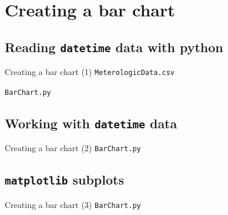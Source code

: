 \documentclass[t]{beamer}
\begin{document}
\section{Creating a bar chart}
\subsection{Reading \texttt{datetime} data with python}
\begin{frame}{Creating a bar chart (1)}
  \small{\texttt{MeterologicData.csv}}
  \vspace{-15pt}\begin{figure}[ht]
  \centering
        \lstset{numbers=left}
        
        
   \end{figure}
  \vspace{-15pt}\small{\texttt{BarChart.py}}
  \vspace{-15pt}\begin{figure}[ht]
  \centering
        \lstset{numbers=left}
        
        
   \end{figure}
\end{frame}

\subsection{Working with \texttt{datetime} data}
\begin{frame}{Creating a bar chart (2)}
  \small{\texttt{BarChart.py}}
  \vspace{-15pt}\begin{figure}[ht]
  \centering
        \lstset{numbers=left}
        
   \end{figure}
\end{frame}

\subsection{\texttt{matplotlib} subplots}
\begin{frame}{Creating a bar chart (3)}
  \small{\texttt{BarChart.py}}
  \vspace{-15pt}\begin{figure}[ht]
  \centering
        \lstset{numbers=left}
        
   \end{figure}
\end{frame}
\end{document}
